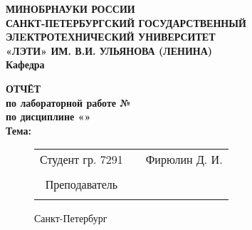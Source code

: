 \documentclass[a4paper, 12pt]{article}
\begin{document}
 


\newcommand{\department}	{} 
\newcommand{\discipline}	{}
\newcommand{\labnumber}		{}
\newcommand{\labname}		{}
\newcommand{\lecturer}		{}

 
\begin{center}
	\textbf{МИНОБРНАУКИ РОССИИ}\\
	\textbf{САНКТ-ПЕТЕРБУРГСКИЙ ГОСУДАРСТВЕННЫЙ ЭЛEКТРОТЕХНИЧЕСКИЙ УНИВЕРСИТЕТ}\\ 
	\textbf{«ЛЭТИ» ИМ. В.И. УЛЬЯНОВА (ЛЕНИНА)}\\
	\textbf{Кафедра \department}\\

	\vspace*{70mm}

	\textbf{ОТЧЁТ}\\
	\textbf{по лабораторной работе №\labnumber}\\
	\textbf{по дисциплине «\discipline»}\\
	\textbf{Тема: \labname}\\

	\begin{figure}[b]
		\centering
		\begin{tabular}{ccc} 
			Студент гр. 7291 & \underline{\hspace{3cm}} &  Фирюлин Д. И. \\\\
			Преподаватель & \underline{\hspace{3cm}} & \lecturer\\\\
		\end{tabular}
		
		\vspace*{10mm}
		Санкт-Петербург
		
		\vspace*{2mm}
		\the\year
		\vspace*{4mm}
	\end{figure}
	
\end{center}
\thispagestyle{empty}

\newpage
\tableofcontents



\end{document}
